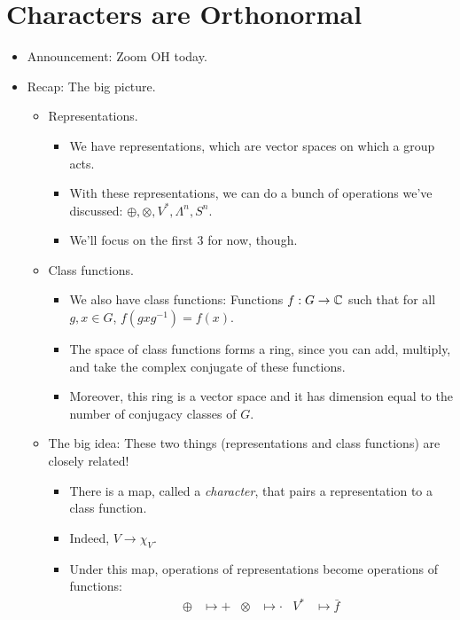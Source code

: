 \documentclass[../notes.tex]{subfiles}
\begin{document}
\section{Characters are Orthonormal}
\begin{itemize}
    \item {}Announcement: Zoom OH today.
    \item Recap: The big picture.
    \begin{itemize}
        \item Representations.
        \begin{itemize}
            \item We have representations, which are vector spaces on which a group acts.
            \item With these representations, we can do a bunch of operations we've discussed: $\oplus,\otimes,V^*,\Lambda^n,S^n$.
            \item We'll focus on the first 3 for now, though.
        \end{itemize}
        \item Class functions.
        \begin{itemize}
            \item We also have class functions: Functions $f:G\to\mathbb{C}$ such that for all $g,x\in G$, $f(gxg^{-1})=f(x)$.
            \item The space of class functions forms a ring, since you can add, multiply, and take the complex conjugate of these functions.
            \item Moreover, this ring is a vector space and it has dimension equal to the number of conjugacy classes of $G$.
        \end{itemize}
        \item The big idea: These two things (representations and class functions) are closely related!
        \begin{itemize}
            \item There is a map, called a \emph{character}, that pairs a representation to a class function.
            \item Indeed, $V\to\chi_V$.
            \item Under this map, operations of representations become operations of functions:
            \begin{align*}
                \oplus &\mapsto +&
                \otimes &\mapsto \cdot&
                V^* &\mapsto \bar{f}
            \end{align*}

\end{itemize}
\end{itemize}
\end{itemize}
\end{document}
